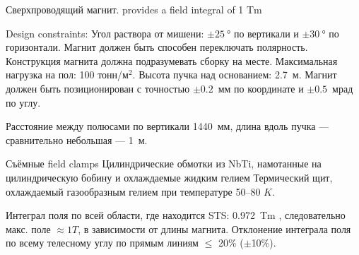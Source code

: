 Сверхпроводящий магнит.
provides a field integral of 1 Tm


Design constraints:
Угол раствора от мишени: $\pm \SI{25}{\degree}$ по вертикали и $\pm \SI{30}{\degree}$ по горизонтали.
Магнит должен быть способен переключать полярность.
Конструкция магнита должна подразумевать сборку на месте.
Максимальная нагрузка на пол: 100 тонн/м$^{2}$.
Высота пучка над основанием: 2.7~м.
Магнит должен быть позиционирован с точностью $\pm0.2$~мм по координате и $\pm0.5$~мрад по углу.

Расстояние между полюсами по вертикали 1440~мм, длина вдоль пучка --- сравнительно небольшая --- 1~м.

Съёмные field clamps
Цилиндрические обмотки из NbTi, намотанные на цилиндрическую бобину и охлаждаемые жидким гелием
Термический щит, охлаждаемый газообразным гелием при температуре 50--80 $K$.

Интеграл поля по всей области, где находится STS: 0.972~Tm \todo, следовательно макс. поле $\approx 1 T $, в зависимости от длины магнита.
Отклонение интеграла поля по всему телесному углу по прямым линиям $\leq$ 20\% ($\pm$10\%).








